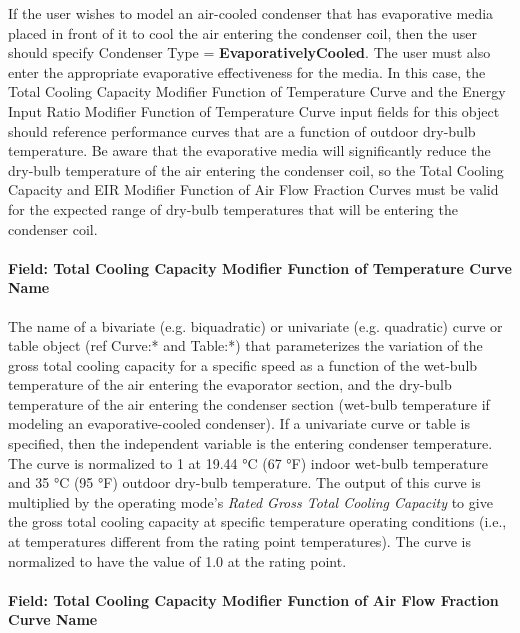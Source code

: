 If the user wishes to model an air-cooled condenser that has evaporative media placed in front of it to cool the air entering the condenser coil, then the user should specify Condenser Type = \textbf{EvaporativelyCooled}. The user must also enter the appropriate evaporative effectiveness for the media. In this case, the Total Cooling Capacity Modifier Function of Temperature Curve and the Energy Input Ratio Modifier Function of Temperature Curve input fields for this object should reference performance curves that are a function of outdoor dry-bulb temperature. Be aware that the evaporative media will significantly reduce the dry-bulb temperature of the air entering the condenser coil, so the Total Cooling Capacity and EIR Modifier Function of Air Flow Fraction Curves must be valid for the expected range of dry-bulb temperatures that will be entering the condenser coil.

\paragraph{Field: Total Cooling Capacity Modifier Function of Temperature Curve Name}\label{field-total-cooling-capacity-function-of-temperature-curve-name}

The name of a bivariate (e.g. biquadratic) or univariate (e.g. quadratic) curve or table object (ref Curve:* and Table:*) that parameterizes the variation of the gross total cooling capacity for a specific speed as a function of the wet-bulb temperature of the air entering the evaporator section, and the dry-bulb temperature of the air entering the condenser section (wet-bulb temperature if modeling an evaporative-cooled condenser). If a univariate curve or table is specified, then the independent variable is the entering condenser temperature. The curve is normalized to 1 at 19.44 °C (67 °F) indoor wet-bulb temperature and 35 °C (95 °F) outdoor dry-bulb temperature. The output of this curve is multiplied by the operating mode's \textit{Rated Gross Total Cooling Capacity} to give the gross total cooling capacity at specific temperature operating conditions (i.e., at temperatures different from the rating point temperatures). The curve is normalized to have the value of 1.0 at the rating point.

\paragraph{Field: Total Cooling Capacity Modifier Function of Air Flow Fraction Curve Name}\label{field-total-cooling-capacity-function-of-air-flow-fraction-curve-name}

